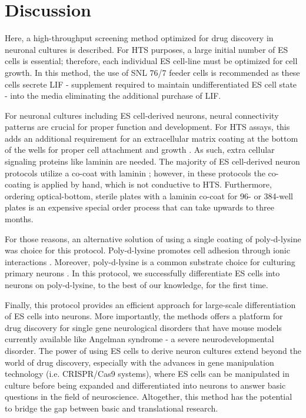 \section{Discussion}

Here, a high-throughput screening method optimized for drug discovery in neuronal cultures is described. For HTS purposes, a large initial number of ES cells is essential; therefore, each individual ES cell-line must be optimized for cell growth. In this method, the use of SNL 76/7 feeder cells is recommended as these cells secrete LIF - supplement required to maintain undifferentiated ES cell state - into the media eliminating the additional purchase of LIF.

For neuronal cultures including ES cell-derived neurons, neural connectivity patterns are crucial for proper function and development. For HTS assays, this adds an additional requirement for an extracellular matrix coating at the bottom of the wells for proper cell attachment and growth \cite{Manthorpe1983,Clark1993,Namba2015}. As such, extra cellular signaling proteins like laminin are needed. The majority of ES cell-derived neuron protocols utilize a co-coat with laminin \cite{Bibel2007,Wu2012}; however, in these protocols the co-coating is applied by hand, which is not conductive to HTS. Furthermore, ordering optical-bottom, sterile plates with a laminin co-coat for 96- or 384-well plates is an expensive special order process that can take upwards to three months.

For those reasons, an alternative solution of using a single coating of poly-d-lysine was choice for this protocol. Poly-d-lysine promotes cell adhesion through ionic interactions \cite{Manthorpe1983}. Moreover, poly-d-lysine is a common substrate choice for culturing primary neurons \cite{Kavalali1999}. In this protocol, we successfully differentiate ES cells into neurons on poly-d-lysine, to the best of our knowledge, for the first time.

Finally, this protocol provides an efficient approach for large-scale differentiation of ES cells into neurons. More importantly, the methods offers a platform for drug discovery for single gene neurological disorders that have mouse models currently available like Angelman syndrome - a severe neurodevelopmental disorder. The power of using ES cells to derive neuron cultures extend beyond the world of drug discovery, especially with the advances in gene manipulation technology (i.e. CRISPR/Cas9 systems), where ES cells can be manipulated in culture before being expanded and differentiated into neurons to answer basic questions in the field of neuroscience. Altogether, this method has the potential to bridge the gap between basic and translational research. 

